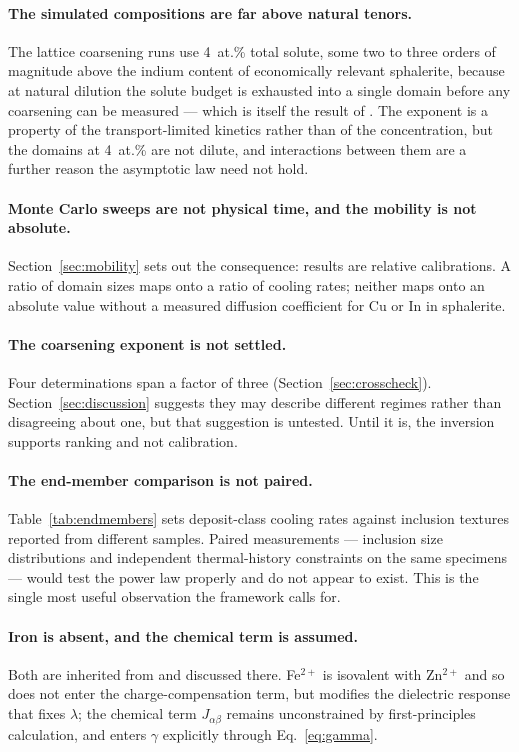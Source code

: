 \documentclass[preprint,12pt,authoryear]{elsarticle}
\begin{document}
\paragraph{The simulated compositions are far above natural tenors.} The lattice
coarsening runs use 4~at.\% total solute, some two to three orders of magnitude
above the indium content of economically relevant sphalerite, because at natural
dilution the solute budget is exhausted into a single domain before any
coarsening can be measured --- which is itself the result of \citet{yu2026b}.
The exponent is a property of the transport-limited kinetics rather than of the
concentration, but the domains at 4~at.\% are not dilute, and interactions
between them are a further reason the asymptotic law need not hold.

\paragraph{Monte Carlo sweeps are not physical time, and the mobility is not
absolute.} Section~\ref{sec:mobility} sets out the consequence: results are
relative calibrations. A ratio of domain sizes maps onto a ratio of cooling
rates; neither maps onto an absolute value without a measured diffusion
coefficient for Cu or In in sphalerite.

\paragraph{The coarsening exponent is not settled.} Four determinations span a
factor of three (Section~\ref{sec:crosscheck}). Section~\ref{sec:discussion}
suggests they may describe different regimes rather than disagreeing about one,
but that suggestion is untested. Until it is, the inversion supports ranking
and not calibration.

\paragraph{The end-member comparison is not paired.} Table~\ref{tab:endmembers}
sets deposit-class cooling rates against inclusion textures reported from
different samples. Paired measurements --- inclusion size distributions and
independent thermal-history constraints on the same specimens --- would test the
power law properly and do not appear to exist. This is the single most useful
observation the framework calls for.

\paragraph{Iron is absent, and the chemical term is assumed.} Both are inherited
from \citet{yu2026} and discussed there. Fe$^{2+}$ is isovalent with
Zn$^{2+}$ and so does not enter the charge-compensation term, but modifies the
dielectric response that fixes $\lambda$; the chemical term $J_{\alpha\beta}$
remains unconstrained by first-principles calculation, and enters $\gamma$
explicitly through Eq.~\eqref{eq:gamma}.
\end{document}
